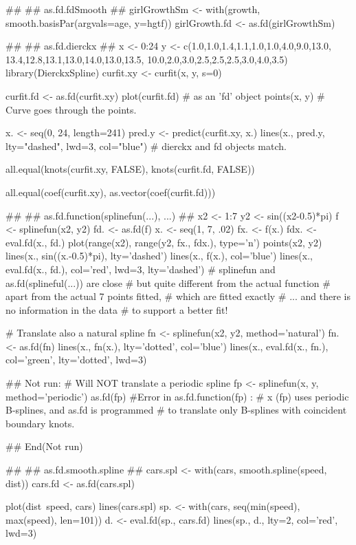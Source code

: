 \begin{Examples}
\begin{ExampleCode}
##
## as.fd.fdSmooth
##
girlGrowthSm <- with(growth, smooth.basisPar(argvals=age, y=hgtf))
girlGrowth.fd <- as.fd(girlGrowthSm)

##
## as.fd.dierckx
##
x <- 0:24
y <- c(1.0,1.0,1.4,1.1,1.0,1.0,4.0,9.0,13.0,
       13.4,12.8,13.1,13.0,14.0,13.0,13.5,
       10.0,2.0,3.0,2.5,2.5,2.5,3.0,4.0,3.5)
library(DierckxSpline) 
curfit.xy <- curfit(x, y, s=0)

curfit.fd <- as.fd(curfit.xy)
plot(curfit.fd) # as an 'fd' object 
points(x, y) # Curve goes through the points.  

x. <- seq(0, 24, length=241)
pred.y <- predict(curfit.xy, x.) 
lines(x., pred.y, lty="dashed", lwd=3, col="blue")
# dierckx and fd objects match.


all.equal(knots(curfit.xy, FALSE), knots(curfit.fd, FALSE))


all.equal(coef(curfit.xy), as.vector(coef(curfit.fd)))




##
## as.fd.function(splinefun(...), ...) 
## 
x2 <- 1:7
y2 <- sin((x2-0.5)*pi)
f <- splinefun(x2, y2)
fd. <- as.fd(f)
x. <- seq(1, 7, .02)
fx. <- f(x.)
fdx. <- eval.fd(x., fd.) 
plot(range(x2), range(y2, fx., fdx.), type='n')
points(x2, y2)
lines(x., sin((x.-0.5)*pi), lty='dashed') 
lines(x., f(x.), col='blue')
lines(x., eval.fd(x., fd.), col='red', lwd=3, lty='dashed')
# splinefun and as.fd(splineful(...)) are close
# but quite different from the actual function
# apart from the actual 7 points fitted,
# which are fitted exactly
# ... and there is no information in the data
# to support a better fit!

# Translate also a natural spline 
fn <- splinefun(x2, y2, method='natural')
fn. <- as.fd(fn)
lines(x., fn(x.), lty='dotted', col='blue')
lines(x., eval.fd(x., fn.), col='green', lty='dotted', lwd=3)

## Not run: 
# Will NOT translate a periodic spline
fp <- splinefun(x, y, method='periodic')
as.fd(fp)
#Error in as.fd.function(fp) : 
#  x (fp)  uses periodic B-splines, and as.fd is programmed
#   to translate only B-splines with coincident boundary knots.

## End(Not run)

##
## as.fd.smooth.spline
##
cars.spl <- with(cars, smooth.spline(speed, dist))
cars.fd <- as.fd(cars.spl)

plot(dist~speed, cars)
lines(cars.spl)
sp. <- with(cars, seq(min(speed), max(speed), len=101))
d. <- eval.fd(sp., cars.fd)
lines(sp., d., lty=2, col='red', lwd=3)
\end{ExampleCode}
\end{Examples}

